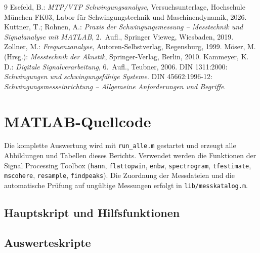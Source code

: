 \documentclass[a4paper,11pt,parskip=half,toc=listof,bibliography=totoc]{scrartcl}
\begin{document}
\begin{thebibliography}{9}
   Esefeld, B.: \emph{MTP/VTP Schwingungsanalyse},
    Versuchsunterlage, Hochschule München FK03, Labor für
    Schwingungstechnik und Maschinendynamik, 2026.
   Kuttner, T.; Rohnen, A.: \emph{Praxis der
    Schwingungsmessung -- Messtechnik und Signalanalyse mit MATLAB},
    2.~Aufl., Springer Vieweg, Wiesbaden, 2019.
   Zollner, M.: \emph{Frequenzanalyse},
    Autoren-Selbstverlag, Regensburg, 1999.
   Möser, M. (Hrsg.): \emph{Messtechnik der Akustik},
    Springer-Verlag, Berlin, 2010.
   Kammeyer, K.\,D.: \emph{Digitale Signalverarbeitung},
    6.~Aufl., Teubner, 2006.
   DIN 1311:2000: \emph{Schwingungen und schwingungsfähige Systeme}.
   DIN 45662:1996-12: \emph{Schwingungsmesseinrichtung --
    Allgemeine Anforderungen und Begriffe}.
\end{thebibliography}

\appendix
\clearpage
\section{MATLAB-Quellcode}\label{sec:anhang}
Die komplette Auswertung wird mit \texttt{run\_alle.m} gestartet und erzeugt
alle Abbildungen und Tabellen dieses Berichts. Verwendet werden die
Funktionen der Signal Processing Toolbox (\texttt{hann}, \texttt{flattopwin},
\texttt{enbw}, \texttt{spectrogram}, \texttt{tfestimate}, \texttt{mscohere},
\texttt{resample}, \texttt{findpeaks}). Die Zuordnung der Messdateien und die
automatische Prüfung auf ungültige Messungen erfolgt in
\texttt{lib/messkatalog.m}.

\subsection*{Hauptskript und Hilfsfunktionen}






\subsection*{Auswerteskripte}






\end{document}
